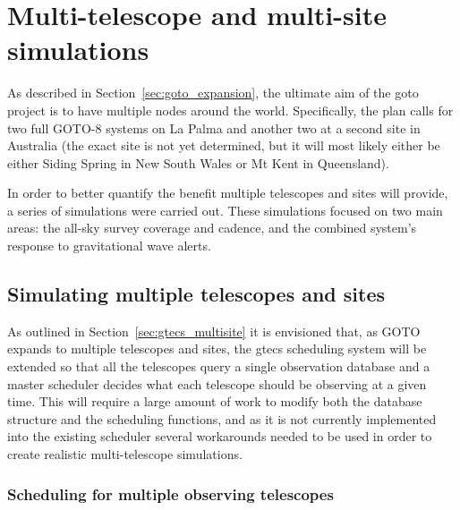 \section{Multi-telescope and multi-site simulations}
\label{sec:multitel_sims}
\begin{colsection}


\begin{colsection}

As described in Section~\ref{sec:goto_expansion}, the ultimate aim of the \gls{goto} project is to have multiple nodes around the world. Specifically, the plan calls for two full GOTO-8 systems on La Palma and another two at a second site in Australia (the exact site is not yet determined, but it will most likely either be either Siding Spring in New South Wales or Mt Kent in Queensland).

In order to better quantify the benefit multiple telescopes and sites will provide, a series of simulations were carried out. These simulations focused on two main areas: the all-sky survey coverage and cadence, and the combined system's response to gravitational wave alerts.

\end{colsection}


\subsection{Simulating multiple telescopes and sites}
\label{sec:multi_site}
\begin{colsection}

As outlined in Section~\ref{sec:gtecs_multisite} it is envisioned that, as GOTO expands to multiple telescopes and sites, the \gls{gtecs} scheduling system will be extended so that all the telescopes query a single observation database and a master scheduler decides what each telescope should be observing at a given time. This will require a large amount of work to modify both the database structure and the scheduling functions, and as it is not currently implemented into the existing scheduler several workarounds needed to be used in order to create realistic multi-telescope simulations.

\subsubsection{Scheduling for multiple observing telescopes}


\end{colsection}
\end{colsection}
